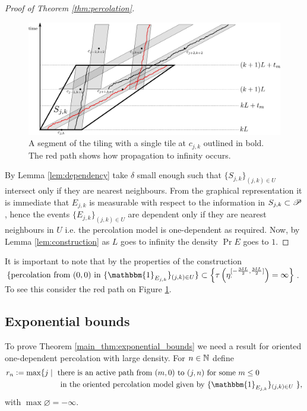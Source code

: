 \begin{proof}[Proof of Theorem \ref{thm:percolation}]
\begin{figure}[!h]
  \includegraphics[width=\linewidth]{images/construction_tiling}
  \caption{A segment of the tiling with a single tile at $c_{j, k}$ outlined in bold. The red path shows how propagation to infinity occurs. }
  \label{fig:construction_tiling}
\end{figure}
By Lemma \ref{lem:dependency} take $\delta$ small enough such that $\{S_{j,k}\}_{(j,k) \in U}$ intersect only if they are nearest neighbours. From the graphical representation it is immediate that $E_{j,k}$ is measurable with respect to the information in $S_{j,k} \subset \mathscr{P}$, hence the events $\{E_{j,k}\}_{(j,k) \in U}$ are dependent only if they are nearest neighbours in $U$ i.e. the percolation model is one-dependent as required. Now, by Lemma \ref{lem:construction} as $L$ goes to infinity the density $\Pr{E}$ goes to $1$. 
\end{proof}
\begin{remark}
It is important to note that by the properties of the construction \newline $\{\text{percolation from $(0,0)$ in $\{\mathbbm{1}_{E_{j,k}}\}_{(j,k) \in U}$}\} \subset \left\{ \tau\left(\eta^{[- \frac{3 \delta L}{2}, \frac{3 \delta L}{2}]}_\cdot \right) = \infty \right\}$. To see this consider the red path on Figure \ref{fig:construction_tiling}. 
\end{remark}

\subsection{Exponential bounds}

To prove Theorem \ref{main_thm:exponential_bounds} we need a result for oriented one-dependent percolation with large density. For $n \in \mathbb{N}$ define 
\begin{align*}
r_n &\defeq \max\{j \mid \text{ there is an active path from $(m,0)$ to $(j,n)$ for some $m\leq 0$} \\ \nonumber&\qquad\qquad\qquad \text{in the oriented percolation model given by $\{\mathbbm{1}_{E_{j,k}}\}_{(j,k) \in U}$ }\}, 
\end{align*}
with $\max \varnothing = - \infty$. 

